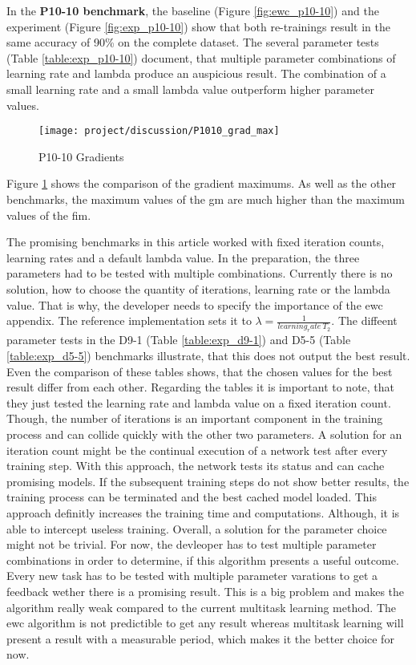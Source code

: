 In the \textbf{P10-10 benchmark}, the baseline (Figure \ref{fig:ewc_p10-10}) and the experiment (Figure \ref{fig:exp_p10-10}) show that both re-trainings result in the same accuracy of 90\% on the complete dataset.
\newline
The several parameter tests (Table \ref{table:exp_p10-10}) document, that multiple parameter combinations of learning rate and lambda produce an auspicious result.
The combination of a small learning rate and a small lambda value outperform higher parameter values.

\begin{figure}[H]
    \centering
    \texttt{[image: project/discussion/P1010\_grad\_max]}
    \caption{P10-10 Gradients}
    \label{fig:dis_d1010}
\end{figure}

Figure \ref{fig:dis_d1010} shows the comparison of the gradient maximums.
As well as the other benchmarks, the maximum values of the \acrshort{gm} are much higher than the maximum values of the \acrshort{fim}.

The promising benchmarks in this article worked with fixed iteration counts, learning rates and a default lambda value.
In the preparation, the three parameters had to be tested with multiple combinations.
Currently there is no solution, how to choose the quantity of iterations, learning rate or the lambda value.
That is why, the developer needs to specify the importance of the \acrshort{ewc} appendix.
The reference implementation sets it to $\lambda = \frac{1}{learning_rate \: T_2 }$.
The diffeent parameter tests in the D9-1 (Table \ref{table:exp_d9-1}) and D5-5 (Table \ref{table:exp_d5-5}) benchmarks illustrate, that this does not output the best result.
Even the comparison of these tables shows, that the chosen values for the best result differ from each other.
Regarding the tables it is important to note, that they just tested the learning rate and lambda value on a fixed iteration count.
Though, the number of iterations is an important component in the training process and can collide quickly with the other two parameters.
A solution for an iteration count might be the continual execution of a network test after every training step.
With this approach, the network tests its status and can cache promising models.
If the subsequent training steps do not show better results, the training process can be terminated and the best cached model loaded.
This approach definitly increases the training time and computations.
Although, it is able to intercept useless training.
Overall, a solution for the parameter choice might not be trivial.
\newline
For now, the devleoper has to test multiple parameter combinations in order to determine, if this algorithm presents a useful outcome.
Every new task has to be tested with multiple parameter varations to get a feedback wether there is a promising result.
This is a big problem and makes the algorithm really weak compared to the current multitask learning method.
The \acrshort{ewc} algorithm is not predictible to get any result whereas multitask learning will present a result with a measurable period, which makes it the better choice for now.

